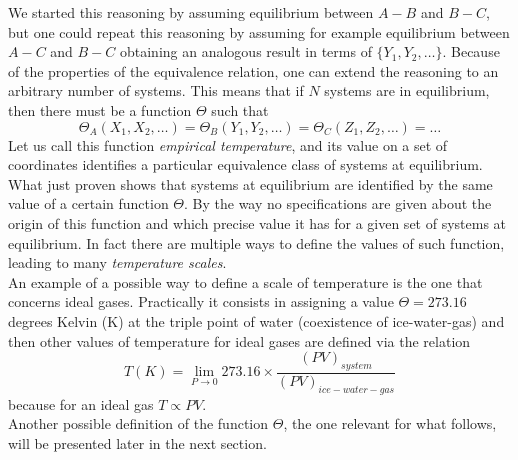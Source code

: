 We started this reasoning by assuming equilibrium between $A-B$ and $B-C$, but one could repeat this reasoning by assuming for example
equilibrium between $A-C$ and $B-C$ obtaining an analogous result in terms of $\{Y_1, Y_2, \dots\}$. Because of the properties of the equivalence relation,
one can extend the reasoning to an arbitrary number of systems. This means that if $N$ systems are in equilibrium, then there must be a function $\Theta$ such that
\begin{equation*}
    \Theta_A(X_1, X_2, \dots) = \Theta_B(Y_1, Y_2, \dots) = \Theta_C(Z_1, Z_2, \dots) = \dots
\end{equation*}
Let us call this function \emph{empirical temperature}, and its value on a set of coordinates identifies a particular equivalence class of systems at equilibrium. \\
What just proven shows that systems at equilibrium are identified by the same value of a certain function $\Theta$. By the way no specifications are given about the origin 
of this function and which precise value it has for a given set of systems at equilibrium. In fact there are multiple ways to define the values of such function, leading
to many \emph{temperature scales}. \\
An example of a possible way to define a scale of temperature is the one that concerns ideal gases. Practically it consists in assigning a value $\Theta = 273.16$ degrees Kelvin (K) at the triple point of water (coexistence of ice-water-gas) and then
other values of temperature for ideal gases are defined via the relation 
\begin{equation*}
    T(K) = \lim_{P \to 0} 273.16 \times \frac{(PV)_{system}}{(PV)_{ice-water-gas}}
\end{equation*}
because for an ideal gas $T \propto PV$. \\
Another possible definition of the function $\Theta$, the one relevant for what follows, will be presented later in the next section.


